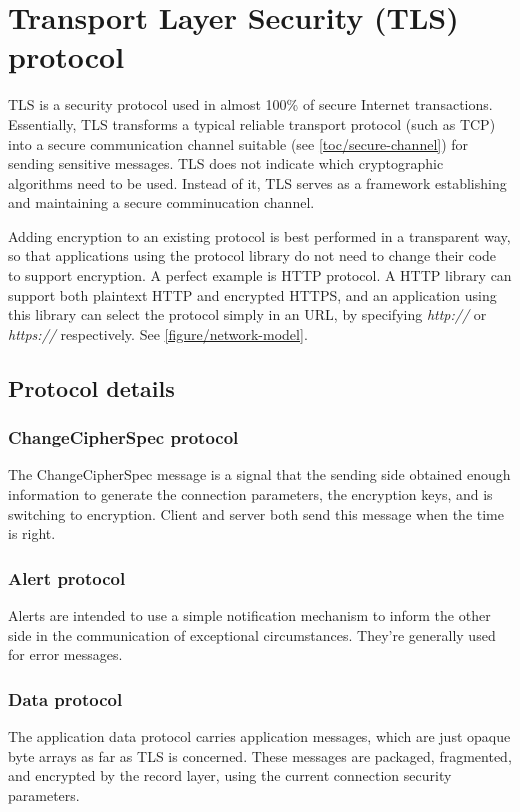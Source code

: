 \chapter{Transport Layer Security (TLS) protocol}



TLS is a security protocol used in almost 100\% of secure Internet transactions. Essentially, TLS transforms a typical reliable transport protocol (such as TCP) into a secure communication channel suitable (see \autoref{toc/secure-channel}) for sending sensitive messages. TLS does not indicate which cryptographic algorithms need to be used. Instead of it, TLS serves as a framework establishing and maintaining a secure comminucation channel.

Adding encryption to an existing protocol is best performed in a transparent way, so that applications using the protocol library do not need to change their code to support encryption. A perfect example is HTTP protocol. A HTTP library can support both plaintext HTTP and encrypted HTTPS, and an application using this library can select the protocol simply in an URL, by specifying \textit{http://} or \textit{https://} respectively. See \autoref{figure/network-model}.



%


\section{Protocol details}



\subsection{ChangeCipherSpec protocol}

The ChangeCipherSpec message is a signal that the sending side obtained enough information to generate the connection parameters, the encryption keys, and is switching to encryption. Client and server both send this message when the time is right.

\subsection{Alert protocol}

Alerts are intended to use a simple notification mechanism to inform the other side in the communication of exceptional circumstances. They’re generally used for error messages.

\subsection{Data protocol}

The application data protocol carries application messages, which are just opaque byte arrays as far as TLS is concerned. These messages are packaged, fragmented, and encrypted by the record layer, using the current connection security parameters.


